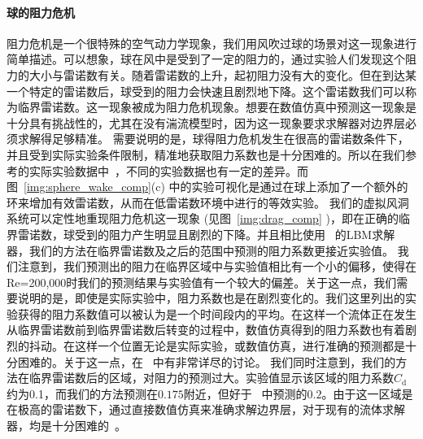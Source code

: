 \paragraph{球的阻力危机}
阻力危机是一个很特殊的空气动力学现象，我们用风吹过球的场景对这一现象进行简单描述。可以想象，球在风中是受到了一定的阻力的，通过实验人们发现这个阻力的大小与雷诺数有关。随着雷诺数的上升，起初阻力没有大的变化。但在到达某一个特定的雷诺数后，球受到的阻力会快速且剧烈地下降。这个雷诺数我们可以称为临界雷诺数。这一现象被成为阻力危机现象。想要在数值仿真中预测这一现象是十分具有挑战性的，尤其在没有湍流模型时，因为这一现象要求求解器对边界层必须求解得足够精准。
需要说明的是，球得阻力危机发生在很高的雷诺数条件下，并且受到实际实验条件限制，精准地获取阻力系数也是十分困难的。所以在我们参考的实际实验数据中~\cite{Morrison-2013, Barati-2014}，不同的实验数据也有一定的差异。而图~\ref{img:sphere_wake_comp}(c) 中的实验可视化是通过在球上添加了一个额外的环来增加有效雷诺数，从而在低雷诺数环境中进行的等效实验。
我们的虚拟风洞系统可以定性地重现阻力危机这一现象 (见图~\ref{img:drag_comp} )，即在正确的临界雷诺数，球受到的阻力产生明显且剧烈的下降。并且相比使用~\cite{Tao-2018-b} 的LBM求解器，我们的方法在临界雷诺数及之后的范围中预测的阻力系数更接近实验值。
我们注意到，我们预测出的阻力在临界区域中与实验值相比有一个小的偏移，使得在Re=200,000时我们的预测结果与实验值有一个较大的偏差。关于这一点，我们需要说明的是，即使是实际实验中，阻力系数也是在剧烈变化的。我们这里列出的实验获得的阻力系数值可以被认为是一个时间段内的平均。在这样一个流体正在发生从临界雷诺数前到临界雷诺数后转变的过程中，数值仿真得到的阻力系数也有着剧烈的抖动。在这样一个位置无论是实际实验，或数值仿真，进行准确的预测都是十分困难的。关于这一点，在~\cite{Geier-2017-b} 中有非常详尽的讨论。
我们同时注意到，我们的方法在临界雷诺数后的区域，对阻力的预测过大。实验值显示该区域的阻力系数$C_\text{d}$约为0.1，而我们的方法预测在$0.175$附近，但好于~\cite{Tao-2018-b} 中预测的$0.2$。由于这一区域是在极高的雷诺数下，通过直接数值仿真来准确求解边界层，对于现有的流体求解器，均是十分困难的~\cite{Tiwari-2020}。

